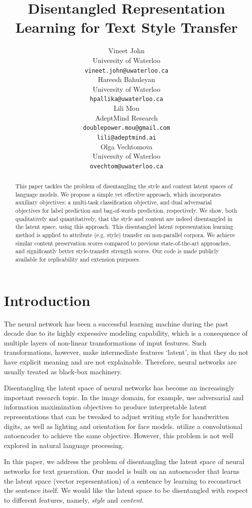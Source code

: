 \documentclass[11pt,a4paper]{article}
\title{Disentangled Representation Learning for Text Style Transfer}
\author{
	Vineet John \\
	University of Waterloo \\
	{\tt vineet.john@uwaterloo.ca} \\
	\And
	Hareesh Bahuleyan \\
	University of Waterloo \\
	{\tt hpallika@uwaterloo.ca} \\
	\AND
	Lili Mou \\
	AdeptMind Research \\
	{\tt doublepower.mou@gmail.com}\\{\tt lili@adeptmind.ai} \\
	\And
	Olga Vechtomova \\
	University of Waterloo \\
	{\tt ovechtom@uwaterloo.ca} \\
}
\date{}
\begin{document}
\maketitle
\graphicspath{{images/}}

\begin{abstract}
	This paper tackles the problem of disentangling the style and content latent spaces of language models. We propose a simple yet effective approach, which incorporates auxiliary objectives: a multi-task classification objective, and dual adversarial objectives for label prediction and bag-of-words prediction, respectively. We show, both qualitatively and quantitatively, that the style and content are indeed disentangled in the latent space, using this approach. This disentangled latent representation learning method is applied to attribute (e.g. style) transfer on non-parallel corpora. We achieve similar content preservation scores compared to previous state-of-the-art approaches, and significantly better style-transfer strength scores. Our code is made publicly available for replicability and extension purposes.
\end{abstract}

% 


\section{Introduction}

The neural network has been a successful learning machine during the past decade due to its highly expressive modeling capability, which is a consequence of multiple layers of non-linear transformations of input features. Such transformations, however, make intermediate features `latent', in that they do not have explicit meaning and are not explainable. Therefore, neural networks are usually treated as black-box machinery.

Disentangling the latent space of neural networks has become an increasingly important research topic. In the image domain, for example, \citet{chen2016infogan} use adversarial and information maximization objectives to produce interpretable latent representations that can be tweaked to adjust writing style for handwritten digits, as well as lighting and orientation for face models. \citet{mathieu2016disentangling} utilize a convolutional autoencoder to achieve the same objective. However, this problem is not well explored in natural language processing.

In this paper, we address the problem of disentangling the latent space of neural networks for text generation. Our model is built on an autoencoder that learns the latent space (vector representation) of a sentence by learning to reconstruct the sentence itself. We would like the latent space to be disentangled with respect to different features, namely, \textit{style} and \textit{content}.
\end{document}

